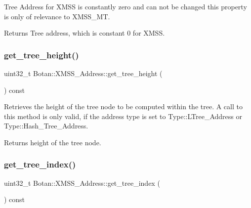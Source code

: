 Tree Address for X\+M\+SS is constantly zero and can not be changed this property is only of relevance to X\+M\+S\+S\+\_\+\+MT.

\begin{DoxyReturn}{Returns}
Tree address, which is constant 0 for X\+M\+SS. 
\end{DoxyReturn}
\mbox{\label{class_botan_1_1_x_m_s_s___address_a7e619c5b15ba74f596eb3d5b6035a0f1}} 
\subsubsection{\texorpdfstring{get\+\_\+tree\+\_\+height()}{get\_tree\_height()}}
{\footnotesize\ttfamily uint32\+\_\+t Botan\+::\+X\+M\+S\+S\+\_\+\+Address\+::get\+\_\+tree\+\_\+height (\begin{DoxyParamCaption}{ }\end{DoxyParamCaption}) const\hspace{0.3cm}{\ttfamily [inline]}}

Retrieves the height of the tree node to be computed within the tree. A call to this method is only valid, if the address type is set to Type\+::\+L\+Tree\+\_\+\+Address or Type\+::\+Hash\+\_\+\+Tree\+\_\+\+Address.

\begin{DoxyReturn}{Returns}
height of the tree node. 
\end{DoxyReturn}
\mbox{\label{class_botan_1_1_x_m_s_s___address_a40990bf9e24b0f2967d18ed6af4197a9}} 
\subsubsection{\texorpdfstring{get\+\_\+tree\+\_\+index()}{get\_tree\_index()}}
{\footnotesize\ttfamily uint32\+\_\+t Botan\+::\+X\+M\+S\+S\+\_\+\+Address\+::get\+\_\+tree\+\_\+index (\begin{DoxyParamCaption}{ }\end{DoxyParamCaption}) const\hspace{0.3cm}{\ttfamily [inline]}}

